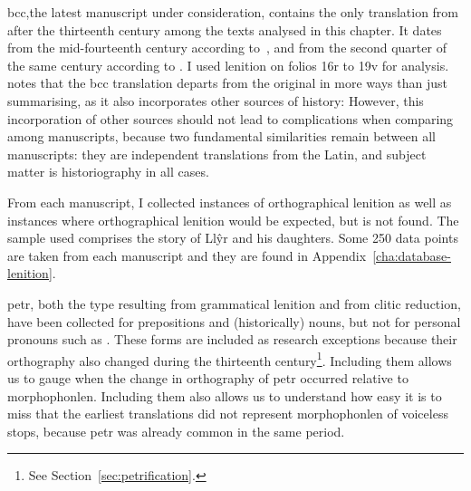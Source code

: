 \Acrfull{bcc},the latest manuscript under consideration, contains the only translation from after the thirteenth century among the texts analysed in this chapter.
It dates from the mid-fourteenth century according to~\textcite[xlv]{Rob_Astudiaeth69}, and from the second quarter of the same century according to \textcite[xviii]{Jon_Brenhinedd71}.
I used lenition on folios 16r to 19v for analysis.
\Textcite{Rob_Testunau74} notes that the \gls{bcc} translation departs from the original in more ways than just summarising, as it also incorporates other sources of history:
However, this incorporation of other sources should not lead to complications when comparing among manuscripts, because two fundamental similarities remain between all manuscripts: they are independent translations from the Latin, and subject matter is historiography in all cases.

From each manuscript, I  collected instances of orthographical
lenition as well as instances  where orthographical lenition would
be expected, but is not found. The sample used comprises the
story of Llŷr and his daughters.  Some 250 data points are taken
from each manuscript and they are found in Appendix~\ref{cha:database-lenition}.

\Gls{petr}, both the type resulting from grammatical lenition and from clitic reduction, have been collected for prepositions
and (historically) nouns, but not for personal pronouns such
as . These forms are included 
as research exceptions because their orthography also changed during the
thirteenth century\footnote{See Section~\ref{sec:petrification}.}. Including them allows
us to gauge when the change in orthography of \gls{petr} occurred relative to \gls{morphophonlen}.
Including them also allows us to understand how easy it is to miss that the earliest translations did not represent  \gls{morphophonlen} of voiceless stops, because \gls{petr} was already common in the same period.

